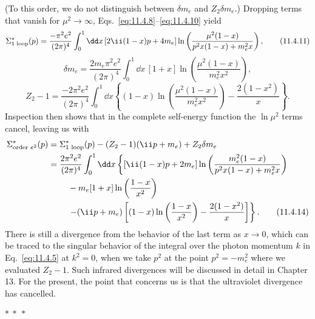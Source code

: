 (To this order, we do not distinguish between $\delta m_e$ and
$Z_2\delta m_e$.) Dropping terms that vanish for $\mu^2\to\infty$,
Eqs.~\eqref{eq:11.4.8}--\eqref{eq:11.4.10} yield
\begin{equation}
\Sigma^*_{\text{1 loop}}(p)=\frac{-\pi^2e^2}{(2\pi)^4}
\int_0^1\dd x\,[2\ii(1-x)\sl{p}+4m_e]
\ln\left(\frac{\mu^2(1-x)}{p^2x(1-x)+m_e^2x}\right),
\tag{11.4.11}\label{eq:11.4.11}
\end{equation}
\begin{equation}
\delta m_e=\frac{2m_e\pi^2e^2}{(2\pi)^4}\int_0^1\dd x\,[1+x]
\ln\left(\frac{\mu^2(1-x)}{m_e^2x^2}\right),
\tag{11.4.12}\label{eq:11.4.12}
\end{equation}
\begin{equation}
Z_2-1=\frac{-2\pi^2e^2}{(2\pi)^4}\int_0^1\dd x
\left\{(1-x)\ln\left(\frac{\mu^2(1-x)}{m_e^2x^2}\right)
-\frac{2(1-x^2)}{x}\right\}.
\tag{11.4.13}\label{eq:11.4.13}
\end{equation}
Inspection then shows that in the complete self-energy function the
$\ln\mu^2$ terms cancel, leaving us with
\begin{align}
\Sigma^*_{\text{order }e^2}(p)
={}&\Sigma^*_{\text{1 loop}}(p)-(Z_2-1)(\ii\sl{p}+m_e)+Z_2\delta m_e
\notag\\
={}&\frac{2\pi^2e^2}{(2\pi)^4}\int_0^1\dd x
\left\{[\ii(1-x)\sl{p}+2m_e]
\ln\left(\frac{m_e^2(1-x)}{p^2x(1-x)+m_e^2x}\right)\right.\notag\\
&\quad-m_e[1+x]\ln\left(\frac{1-x}{x^2}\right)\notag\\
&\quad\left.-(\ii\sl{p}+m_e)\left[(1-x)
\ln\left(\frac{1-x}{x^2}\right)-\frac{2(1-x^2)}{x}\right]\right\}.
\tag{11.4.14}\label{eq:11.4.14}
\end{align}
There is still a divergence from the behavior of the last term as $x\to0$,
which can be traced to the singular behavior of the integral over the photon
momentum $k$ in Eq.~\eqref{eq:11.4.5} at $k^2=0$, when we take $p^2$ at the point
$p^2=-m_e^2$ where we evaluated $Z_2-1$. Such infrared divergences will be
discussed in detail in Chapter 13. For the present, the point that concerns us
is that the ultraviolet divergence has cancelled.

\begin{center}
$*\ *\ *$
\end{center}

